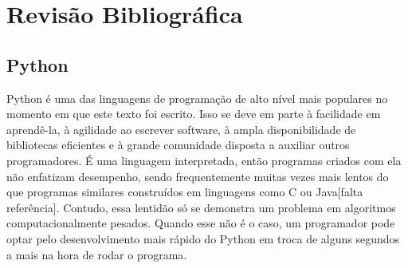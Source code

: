 \documentclass[12pt,a4paper]{ufpr}
\begin{document}

\chapter{Revisão Bibliográfica}
\label{revisao}

\section{Python}

Python\cite{python} é uma das linguagens de programação de alto nível mais populares no momento em que este texto foi escrito\cite{toplanguages2015}. Isso se deve em parte à facilidade em aprendê-la, à agilidade ao escrever software, à ampla disponibilidade de bibliotecas eficientes e à grande comunidade disposta a auxiliar outros programadores. 
É uma linguagem interpretada, então programas criados com ela não enfatizam desempenho, sendo frequentemente muitas vezes mais lentos do que programas similares construídos em linguagens como C ou Java[falta referência].
Contudo, essa lentidão só se demonstra um problema em algoritmos computacionalmente pesados.
Quando esse não é o caso, um programador pode optar pelo desenvolvimento mais rápido do Python em troca de alguns segundos a mais na hora de rodar o programa.
\end{document}
